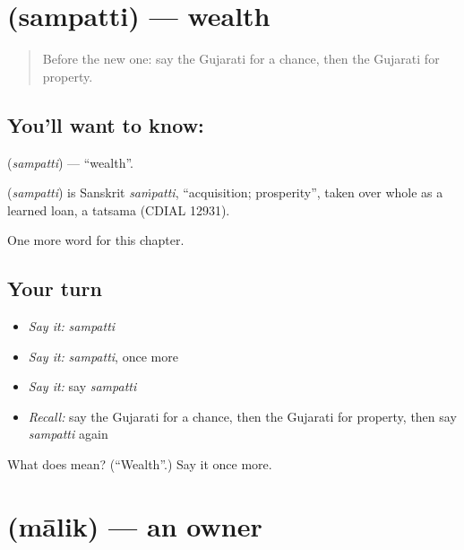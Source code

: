 \section[\texorpdfstring{\gu{સંપત્તિ} (sampatti)}{સંપત્તિ (sampatti)}]{ (sampatti) — wealth}

\label{lesson:GU-C103-sampatti}



\begin{quote}
Before the new one: say the Gujarati for a chance, then the Gujarati for property.
\end{quote}

\subsection*{You'll want to know: }
\textbf{} (\emph{sampatti}) — \textquotedblleft{}wealth\textquotedblright{}.

\begin{cousinweb}
\textbf{} (\emph{sampatti}) is Sanskrit \emph{saṁpatti}, \textquotedblleft{}acquisition; prosperity\textquotedblright{}, taken over whole as a learned loan, a tatsama (CDIAL 12931).
\end{cousinweb}

\begin{grammarlens}[title={What you've built}]
One more word for this chapter.
\end{grammarlens}

\subsection*{Your turn}
\begin{itemize}
\raggedright
  \item \emph{Say it:} \emph{sampatti}
  \item \emph{Say it:} \emph{sampatti}, once more
  \item \emph{Say it:} say \emph{sampatti}
  \item \emph{Recall:} say the Gujarati for a chance, then the Gujarati for property, then say \emph{sampatti} again
\end{itemize}

\begin{tcolorbox}[breakable,colback=teal!4,colframe=teal!35!black,title={Before you move on}]
What does  mean? (\textquotedblleft{}Wealth\textquotedblright{}.) Say it once more.
\end{tcolorbox}
\section[\texorpdfstring{\gu{માલિક} (mālik)}{માલિક (mālik)}]{ (mālik) — an owner}

